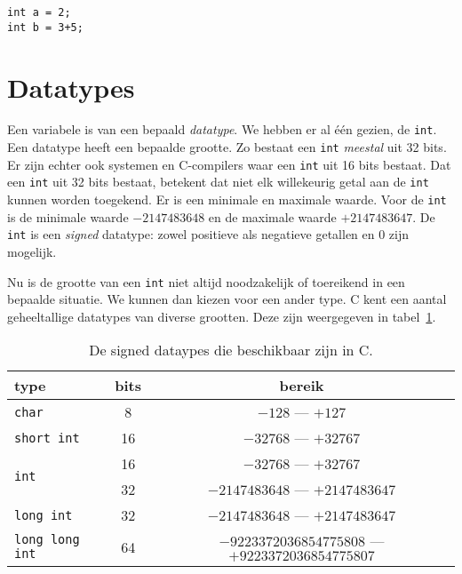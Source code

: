 \hspace*{1em}\texttt{int a = 2;}\\
\hspace*{1em}\texttt{int b = 3+5;}

\section{Datatypes}
Een variabele is van een bepaald \textsl{datatype}. We hebben er al één gezien, de \texttt{int}. Een datatype heeft een bepaalde grootte. Zo bestaat een \texttt{int} \textsl{meestal} uit 32 bits. Er zijn echter ook systemen en C-compilers waar een \texttt{int} uit 16 bits bestaat. Dat een \texttt{int} uit 32 bits bestaat, betekent dat niet elk willekeurig getal aan de \texttt{int} kunnen worden toegekend. Er is een minimale en maximale waarde. Voor de \texttt{int} is de minimale waarde $-2147483648$ en de maximale waarde $+2147483647$. De \texttt{int} is een \textsl{signed} datatype: zowel positieve als negatieve getallen en 0 zijn mogelijk.

Nu is de grootte van een \texttt{int} niet altijd noodzakelijk of toereikend in een bepaalde situatie. We kunnen dan kiezen voor een ander type. C kent een aantal geheeltallige datatypes van diverse grootten. Deze zijn weergegeven in tabel~\ref{tab:varintdatatypes}.

\begin{table}[!ht]
\centering
\caption{De signed dataypes die beschikbaar zijn in C.}
\label{tab:varintdatatypes}
\begin{tabular}{@{}lcc@{}}
\toprule
\textbf{type}          & \textbf{bits} & \textbf{bereik}  \\ \midrule
\texttt{char}          & 8                       & $-128$ --- $+127$  \\
\texttt{short int}     & 16                      & $-32768$ --- $+32767$ \\
\multirow{2}{*}{\texttt{int}}   & 16                      & $-32768$ --- $+32767$ \\
                       & 32                      & $-2147483648$ --- $+2147483647$ \\
\texttt{long int}      & 32                      & $-2147483648$ --- $+2147483647$  \\
\texttt{long long int} & 64                      & $-9223372036854775808$ --- $+9223372036854775807$  \\
   \bottomrule
\end{tabular}
\end{table}

